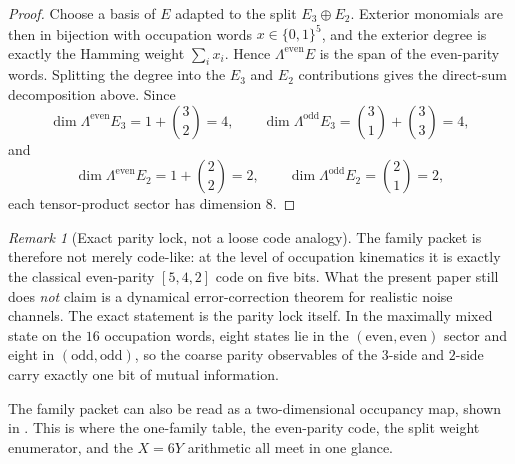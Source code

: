 \documentclass[11pt,a4paper]{article}
\theoremstyle{definition}
\theoremstyle{remark}
\newtheorem*{remark}{Remark}
\begin{document}
\begin{proof}
Choose a basis of $E$ adapted to the split $E_3\oplus E_2$. Exterior monomials are then in bijection with occupation words $x\in\{0,1\}^5$, and the exterior degree is exactly the Hamming weight $\sum_i x_i$. Hence $\Lambda^{\mathrm{even}}E$ is the span of the even-parity words. Splitting the degree into the $E_3$ and $E_2$ contributions gives the direct-sum decomposition above. Since
\[
\dim \Lambda^{\mathrm{even}}E_3=1+\binom32=4,
\qquad
\dim \Lambda^{\mathrm{odd}}E_3=\binom31+\binom33=4,
\]
and
\[
\dim \Lambda^{\mathrm{even}}E_2=1+\binom22=2,
\qquad
\dim \Lambda^{\mathrm{odd}}E_2=\binom21=2,
\]
each tensor-product sector has dimension $8$.
\end{proof}

\begin{remark}[Exact parity lock, not a loose code analogy]
The family packet is therefore not merely code-like: at the level of occupation kinematics it is exactly the classical even-parity $[5,4,2]$ code on five bits. What the present paper still does \emph{not} claim is a dynamical error-correction theorem for realistic noise channels. The exact statement is the parity lock itself. In the maximally mixed state on the $16$ occupation words, eight states lie in the $(\mathrm{even},\mathrm{even})$ sector and eight in $(\mathrm{odd},\mathrm{odd})$, so the coarse parity observables of the $3$-side and $2$-side carry exactly one bit of mutual information.
\end{remark}

The family packet can also be read as a two-dimensional occupancy map, shown in . This is where the one-family table, the even-parity code, the split weight enumerator, and the $X=6Y$ arithmetic all meet in one glance.
\end{document}
